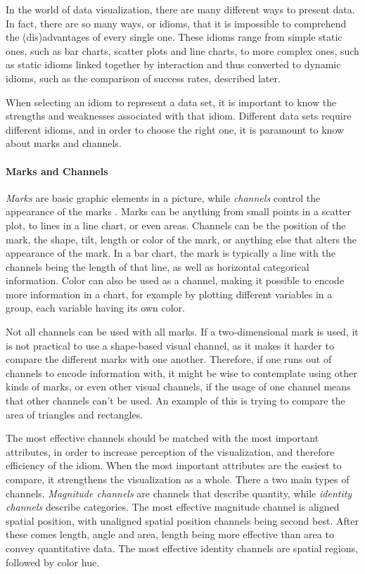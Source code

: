 \documentclass[Report.tex]{subfiles}
\begin{document}
In the world of data visualization, there are many different ways to present
data. In fact, there are so many ways, or idioms, that it is impossible to
comprehend the (dis)advantages of every single one. These idioms range from
simple static ones, such as bar charts, scatter plots and line charts, to
more complex ones, such as static idioms linked together by interaction and thus converted to dynamic idioms,
such as the comparison of success rates, described later. 

When selecting an idiom to represent a data set, it is important to know the
strengths and weaknesses associated with that idiom. Different data sets
require different idioms, and in order to choose the right one, it is paramount
to know about marks and channels. 
\paragraph{Marks and Channels\\}
\emph{Marks} are basic graphic elements in a picture, while \emph{channels} control the
appearance of the marks \cite[Chapter 5, p. 95-96]{Tamara}. Marks can be anything 
from small points in a scatter plot, to lines in a line
chart, or even areas. Channels can be the position of the mark, the shape, tilt,
length or color of the mark, or anything else that alters the appearance of the
mark.
In a bar chart, the mark is typically a line with the channels being the length
of that line, as well as horizontal categorical information. Color can also be used as a channel,
making it possible to encode more information in a chart, for example by
plotting different variables in a group, each variable having its own color. 

Not all channels can be used with all marks. If a two-dimensional mark is used, 
it is not practical to use a shape-based visual channel, as it makes it
harder to compare the different marks with one another. Therefore, if one runs out
of channels to encode information with, it might be wise to contemplate using
other kinds of marks, or even other visual channels, if the usage of one channel
means that other channels can't be used. An example of this is trying to compare 
the area of triangles and rectangles.

The most effective channels should be matched with the most important
attributes, in order to increase perception of the visualization, and therefore
efficiency of the idiom. When the most important attributes are the easiest to
compare, it strengthens the visualization as a whole. 
There a two main types of channels. \emph{Magnitude channels} are channels that describe quantity, 
while \emph{identity channels} describe categories.
The most effective magnitude channel is
aligned spatial position, with unaligned spatial position channels being second
best. After these comes length, angle and area,
length being more effective than area to convey quantitative data. 
The most effective identity channels are
spatial regions, followed by color hue\cite[Chapter 5, p. 101]{Tamara}.
\end{document}
